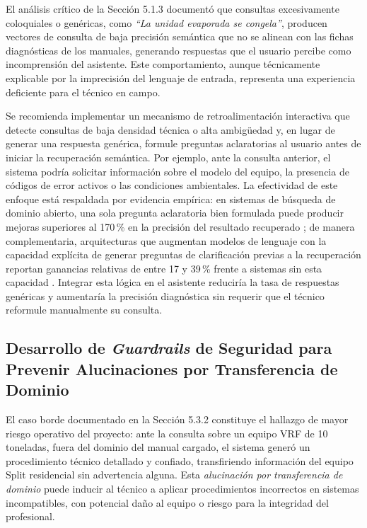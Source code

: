 {El análisis crítico de la Sección 5.1.3 documentó que consultas excesivamente coloquiales o genéricas, como \textit{``La unidad evaporada se congela''}, producen vectores de consulta de baja precisión semántica que no se alinean con las fichas diagnósticas de los manuales, generando respuestas que el usuario percibe como incomprensión del asistente. Este comportamiento, aunque técnicamente explicable por la imprecisión del lenguaje de entrada, representa una experiencia deficiente para el técnico en campo.

Se recomienda implementar un mecanismo de retroalimentación interactiva que detecte consultas de baja densidad técnica o alta ambigüedad y, en lugar de generar una respuesta genérica, formule preguntas aclaratorias al usuario antes de iniciar la recuperación semántica. Por ejemplo, ante la consulta anterior, el sistema podría solicitar información sobre el modelo del equipo, la presencia de códigos de error activos o las condiciones ambientales. La efectividad de este enfoque está respaldada por evidencia empírica: en sistemas de búsqueda de dominio abierto, una sola pregunta aclaratoria bien formulada puede producir mejoras superiores al 170\,\% en la precisión del resultado recuperado \parencite{aliannejadi2019clarifying}; de manera complementaria, arquitecturas que augmentan modelos de lenguaje con la capacidad explícita de generar preguntas de clarificación previas a la recuperación reportan ganancias relativas de entre 17 y 39\,\% frente a sistemas sin esta capacidad \parencite{chi2024clarinet}. Integrar esta lógica en el asistente reduciría la tasa de respuestas genéricas y aumentaría la precisión diagnóstica sin requerir que el técnico reformule manualmente su consulta.

\subsection{Desarrollo de \textit{Guardrails} de Seguridad para Prevenir Alucinaciones por Transferencia de Dominio}

El caso borde documentado en la Sección 5.3.2 constituye el hallazgo de mayor riesgo operativo del proyecto: ante la consulta sobre un equipo VRF de 10 toneladas, fuera del dominio del manual cargado, el sistema generó un procedimiento técnico detallado y confiado, transfiriendo información del equipo Split residencial sin advertencia alguna. Esta \textit{alucinación por transferencia de dominio} puede inducir al técnico a aplicar procedimientos incorrectos en sistemas incompatibles, con potencial daño al equipo o riesgo para la integridad del profesional.

}
